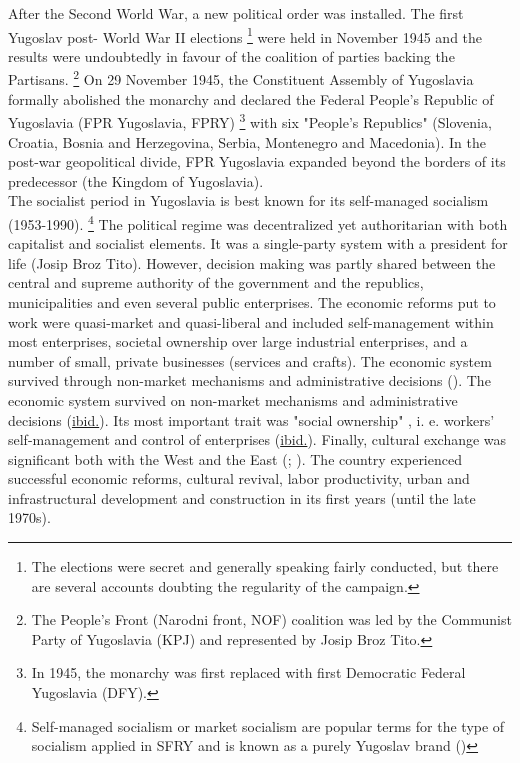 \documentclass[11pt]{report}
\begin{document}
After the Second World War, a new political order was installed. The first Yugoslav post- World War II elections
\footnote{The elections were secret and generally speaking fairly conducted, but there are several accounts doubting the regularity of the campaign.}
were held in November 1945 and the results were undoubtedly in favour of the coalition of parties backing the Partisans.
\footnote{The People’s Front (Narodni front, NOF) coalition was led by the Communist Party of Yugoslavia (KPJ) and
represented by Josip Broz Tito.}
On 29 November 1945, the Constituent Assembly of Yugoslavia formally abolished the monarchy and declared the Federal People's Republic of Yugoslavia (FPR Yugoslavia, FPRY)
\footnote{In 1945, the monarchy was first replaced with  first Democratic Federal Yugoslavia (DFY).}
with six "People's Republics" (Slovenia, Croatia, Bosnia and Herzegovina, Serbia, Montenegro and Macedonia).
In the post-war geopolitical divide, FPR Yugoslavia expanded beyond the borders of its predecessor (the Kingdom of Yugoslavia).
\\

The socialist period in Yugoslavia is best known for its self-managed socialism (1953-1990).
\footnote{Self-managed socialism or market socialism are popular terms for the type of socialism applied in SFRY and is known as a purely Yugoslav brand (\href{Estrin}{\citealt{estrin_yugoslavia:_1991}})}
The political regime was decentralized yet authoritarian with both capitalist and socialist elements. It was a single-party system with a president for life (Josip Broz Tito). However, decision making was partly shared between the central and supreme authority of the government and the republics, municipalities and even several public enterprises. The economic reforms put to work were quasi-market and quasi-liberal and included self-management within most  enterprises, societal ownership over large industrial enterprises, and a number of small, private businesses (services and crafts). The economic system survived through non-market mechanisms and administrative decisions (\href{Estrin}{\citealt{estrin_yugoslavia:_1991}}).
The economic system survived on non-market mechanisms and administrative decisions (\href{ref}{ibid.}).
Its most important trait was "social  ownership" , i. e.  workers' self-management and control of  enterprises (\href{ref}{ibid.}).
Finally, cultural exchange was significant both with the West and the East  (\href{Hirt}{\citealt{hirt_belgrade_2009}}; \href{Vujosevic}{\citealt{vujosevic_conundrum_2012}}).
The country experienced successful economic reforms, cultural revival, labor productivity, urban and infrastructural development and construction in its first years (until the late 1970s).
\\
\end{document}
